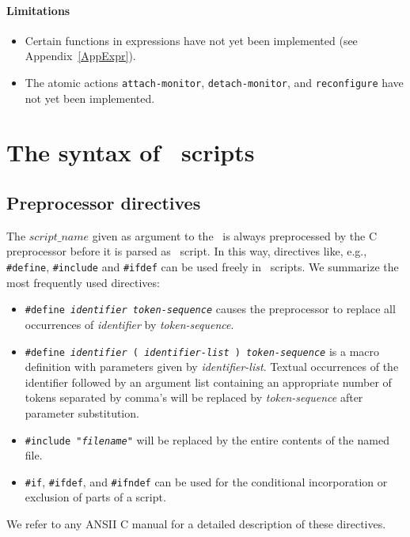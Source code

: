 \documentclass[a4,twoside,noweb]{article} %
\begin{document}
\paragraph{Limitations}
\begin{itemize}
\item Certain functions in expressions have not yet been implemented
(see Appendix~\ref{AppExpr}).

\item The atomic actions {\tt attach-monitor}, {\tt detach-monitor},
and {\tt reconfigure} have not yet been implemented.
\end{itemize}

\newpage
\section{The syntax of \T\ scripts}
\subsection{Preprocessor directives}

The $script\_name$ given as argument to the \TB\ is always
preprocessed by the C preprocessor before it is parsed as \T\ script.
In this way, directives like, e.g., {\tt \#define}, {\tt \#include} and
{\tt \#ifdef} can be used freely in \T\ scripts. We summarize the
most frequently used directives:
\begin{itemize}
\item {\tt \#define {\em identifier} {\em token-sequence}} causes
the preprocessor to replace all occurrences of {\em identifier}
by {\em token-sequence}.
\item {\tt \#define {\em identifier} ( {\em identifier-list} ) {\em token-sequence}} is
a macro definition with parameters given by {\em identifier-list}.
Textual occurrences of the identifier followed by an argument list
containing an appropriate number of tokens separated by comma's
will be replaced by {\em token-sequence} after parameter substitution.
\item {\tt \#include "{\em filename}"} will be replaced by the
entire contents of the named file.
\item {\tt \#if}, {\tt \#ifdef}, and {\tt \#ifndef} can be used for
the conditional incorporation or exclusion of parts of a script.
\end{itemize}

\noindent We refer to any ANSII C manual for a detailed description of these
directives. 
\end{document}
